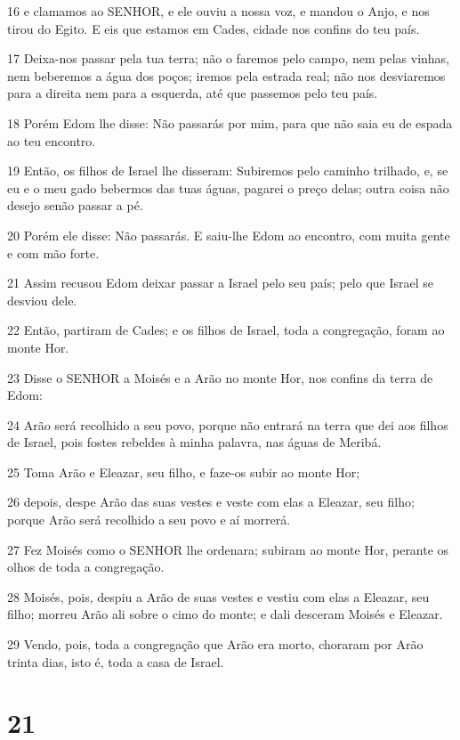 \par 16 e clamamos ao SENHOR, e ele ouviu a nossa voz, e mandou o Anjo, e nos tirou do Egito. E eis que estamos em Cades, cidade nos confins do teu país.
\par 17 Deixa-nos passar pela tua terra; não o faremos pelo campo, nem pelas vinhas, nem beberemos a água dos poços; iremos pela estrada real; não nos desviaremos para a direita nem para a esquerda, até que passemos pelo teu país.
\par 18 Porém Edom lhe disse: Não passarás por mim, para que não saia eu de espada ao teu encontro.
\par 19 Então, os filhos de Israel lhe disseram: Subiremos pelo caminho trilhado, e, se eu e o meu gado bebermos das tuas águas, pagarei o preço delas; outra coisa não desejo senão passar a pé.
\par 20 Porém ele disse: Não passarás. E saiu-lhe Edom ao encontro, com muita gente e com mão forte.
\par 21 Assim recusou Edom deixar passar a Israel pelo seu país; pelo que Israel se desviou dele.
\par 22 Então, partiram de Cades; e os filhos de Israel, toda a congregação, foram ao monte Hor.
\par 23 Disse o SENHOR a Moisés e a Arão no monte Hor, nos confins da terra de Edom:
\par 24 Arão será recolhido a seu povo, porque não entrará na terra que dei aos filhos de Israel, pois fostes rebeldes à minha palavra, nas águas de Meribá.
\par 25 Toma Arão e Eleazar, seu filho, e faze-os subir ao monte Hor;
\par 26 depois, despe Arão das suas vestes e veste com elas a Eleazar, seu filho; porque Arão será recolhido a seu povo e aí morrerá.
\par 27 Fez Moisés como o SENHOR lhe ordenara; subiram ao monte Hor, perante os olhos de toda a congregação.
\par 28 Moisés, pois, despiu a Arão de suas vestes e vestiu com elas a Eleazar, seu filho; morreu Arão ali sobre o cimo do monte; e dali desceram Moisés e Eleazar.
\par 29 Vendo, pois, toda a congregação que Arão era morto, choraram por Arão trinta dias, isto é, toda a casa de Israel.

\chapter{21}

